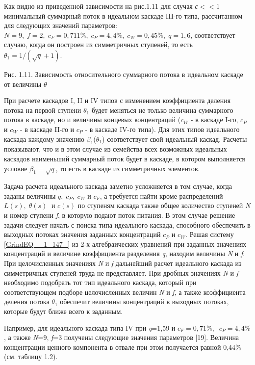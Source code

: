 Как видно из приведенной зависимости на рис.1.11 для случая \textit{с}$\mathrm{<}$$\mathrm{<}$1 минимальный суммарный поток в идеальном каскаде III-го типа, рассчитанном для следующих значений параметров: $N=9,\; f=2,\; c_{F} =0,711\% ,\; c_{P} =4,4\% ,\; c_{W} =0,45\% ,\; q=1,6$, соответствует случаю, когда он построен из симметричных ступеней, то есть $\theta _{1} =1/\left(\sqrt{q} +1\right)$.



Рис. 1.11. Зависимость относительного суммарного потока в идеальном каскаде от величины $\theta _{} $

При расчете каскадов I, II и IV типов с изменением коэффициента деления потока на первой ступени $\theta _{1} $ будет меняться не только величина суммарного потока в каскаде, но и величины концевых концентраций ($c_{W} $ - в каскаде I-го, $c_{P} $ и $c_{W} $ - в каскаде II-го и $c_{P} $ - в каскаде IV-го типа). Для этих типов идеального каскада каждому значению $\beta _{1} $($\theta _{1} $) соответствует свой идеальный каскад. Расчеты показывают, что и в этом случае из семейства всех возможных идеальных каскадов наименьший суммарный поток будет в каскаде, в котором выполняется условие $\beta _{1} =\sqrt{q} $, то есть в каскаде из симметричных элементов.

Задача расчета идеального каскада заметно усложняется в том случае, когда заданы величины $q,\; c_{P} ,\; c_{W} $ и $c_{F} $, а требуется найти кроме распределений $L(s),\; \theta (s)\; $ и $c(s)$ по ступеням каскада также общее количество ступеней \textit{N} и номер ступени\textit{ f}, в которую подают поток питания. В этом случае решение задачи следует начать с поиска типа идеального каскада, способного обеспечить в выходных потоках значения заданных концентраций $c_{P} $ и $c_{W} $. Решая систему \ref{GrindEQ__1_147_} из 2-х алгебраических уравнений при заданных значениях концентраций и величине коэффициента разделения \textit{q}, находим величины \textit{N} и \textit{f}. При целочисленных значениях \textit{N} и \textit{f} дальнейший расчет идеального каскада из симметричных ступеней труда не представляет. При дробных значениях \textit{N} и \textit{f} необходимо подобрать тот тип идеального каскада, который при соответствующем подборе целочисленных величин \textit{N} и \textit{f}, а также коэффициента деления потока $\theta _{1} $ обеспечит величины концентраций в выходных потоках, которые будут ближе всего к заданным. 

Например, для идеального каскада типа IV при \textit{q}=1,59 и $c_{F} =0,71\% ,\; \; c_{P} =4,4\% $, а также \textit{N}=9, \textit{f}=3 получены следующие значения параметров [19]. Величина концентрации ценного компонента в отвале при этом получается равной 0,44\% (см. таблицу 1.2).

